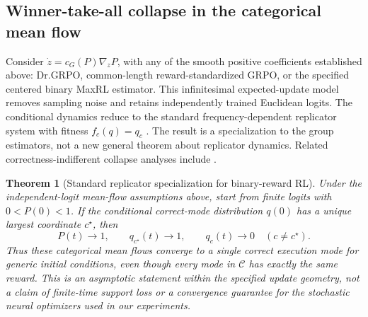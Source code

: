 \documentclass{article}
\newcommand{\1}{\mathbf 1}
\newtheorem{theorem}[lemma]{Theorem}
\theoremstyle{remark}
\theoremstyle{definition}
\theoremstyle{plain}
\begin{document}
\subsection{Winner-take-all collapse in the categorical mean flow}
\label{app:theory-collapse}

Consider $\dot z=c_G(P)\nabla_zP$, with any of the smooth positive
coefficients established above: Dr.GRPO, common-length reward-standardized
GRPO, or the specified centered binary MaxRL estimator. This infinitesimal
expected-update model removes
sampling noise and retains independently trained Euclidean logits. The
conditional dynamics reduce to the standard frequency-dependent replicator
system with fitness $f_c(q)=q_c$ \citep{hofbauer1998evolutionary}. The result is
a specialization to the group estimators, not a new general theorem about
replicator dynamics. Related correctness-indifferent collapse analyses include
\citet{sinha2026expected,lochab2026ucpo}.

\begin{theorem}[Standard replicator specialization for binary-reward RL]
\label{thm:grpo-collapse}
Under the independent-logit mean-flow assumptions above, start from finite
logits with $0<P(0)<1$. If the conditional correct-mode
distribution $q(0)$ has a unique largest coordinate $c^\star$, then
\[
  P(t)\longrightarrow1,
  \qquad
  q_{c^\star}(t)\longrightarrow1,
  \qquad
  q_c(t)\longrightarrow0\quad(c\ne c^\star).
\]
Thus these categorical mean flows converge to a single correct execution
mode for generic initial conditions, even though every mode in $\mathcal C$
has exactly the same reward. This is an asymptotic statement within the
specified update geometry, not a claim of finite-time support loss or a
convergence guarantee for the stochastic neural optimizers used in our experiments.
\end{theorem}
\end{document}
